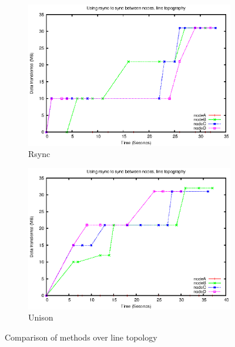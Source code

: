 \documentclass[12pt]{article}
\begin{document}
\begin{figure}[htp]
    \begin{subfigure}[b]{0.5\linewidth}
        \centering
        \includegraphics[scale=0.5]{images/line-rsync-10-fixes.eps}
        \caption{Rsync}
        \label{fig:line_rsync}
    \end{subfigure}
    \begin{subfigure}[b]{0.5\linewidth}
        \centering
        \includegraphics[scale=0.5]{images/line-uni-10-fixes.eps}
        \caption{Unison}
        \label{fig:line_uni}
    \end{subfigure}
    \caption{Comparison of methods over line topology}
\end{figure}
\end{document}
